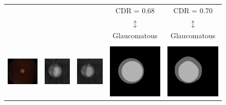 \begin{figure}[!htbp]
\begin{tabular}{|c c c c c|}
{} & {} & {} & CDR = 0.68 & CDR = 0.70 \\
{} & {} & {} & $\updownarrow$ & $\updownarrow$ \\
{} & {} & {} & Glaucomatous & Glaucomatous \\

\hline

{} & {} & {} & {} & {} \\

\includegraphics[width=3.5cm]{Images/Results/Results/drishti02/od_detect_frame.png} &
\includegraphics[width=3cm]{Images/Results/Results/drishti02/0_crop.png} &
\includegraphics[width=3.0cm]{Images/Results/Results/drishti02/1_kmeans.png} & \includegraphics[width=3cm]{Images/Results/Results/drishti02/overlay.png} &
\includegraphics[width=3cm]{Images/Results/Results/drishti02/overlay_gt.png} \\


\end{tabular}
\end{figure}
